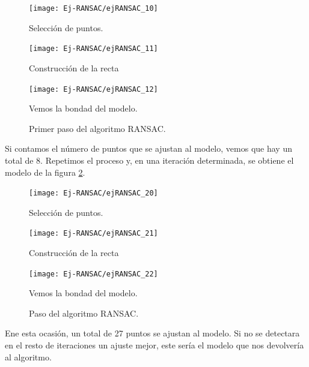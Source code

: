 \begin{figure}[h!]
	\begin{minipage}[b]{0.5\textwidth}
		\centering
		\texttt{[image: Ej-RANSAC/ejRANSAC\_10]} 
		\caption*{Selección de puntos.}
	\end{minipage}
\begin{minipage}[b]{0.5\textwidth}
	\centering
	\texttt{[image: Ej-RANSAC/ejRANSAC\_11]} 
	\caption*{Construcción de la recta}
\end{minipage}
\begin{center}
	\begin{minipage}[b]{0.5\textwidth}
	\centering
	\texttt{[image: Ej-RANSAC/ejRANSAC\_12]} 
	\caption*{Vemos la bondad del modelo.}
\end{minipage}
\end{center}
	\caption{Primer paso del algoritmo RANSAC.}
	\label{fig:RNASAC-s1}
\end{figure}

Si contamos el número de puntos que se ajustan al modelo, vemos que hay un total de 8. Repetimos el proceso y, en una iteración determinada, se obtiene el modelo de la figura \ref{fig:RNASAC-s2}.\\

\begin{figure}[h!]
	\begin{minipage}[b]{0.5\textwidth}
		\centering
		\texttt{[image: Ej-RANSAC/ejRANSAC\_20]} 
		\caption*{Selección de puntos.}
	\end{minipage}
	\begin{minipage}[b]{0.5\textwidth}
		\centering
		\texttt{[image: Ej-RANSAC/ejRANSAC\_21]} 
		\caption*{Construcción de la recta}
	\end{minipage}
	\begin{center}
		\begin{minipage}[b]{0.5\textwidth}
		\centering
		\texttt{[image: Ej-RANSAC/ejRANSAC\_22]} 
		\caption*{Vemos la bondad del modelo.}
	\end{minipage}
	\end{center}
	\caption{Paso del algoritmo RANSAC.}
	\label{fig:RNASAC-s2}
\end{figure}
Ene esta ocasión, un total de 27 puntos se ajustan al modelo. Si no se detectara en el resto de iteraciones un ajuste mejor, este sería el modelo que nos devolvería al algoritmo. \\

